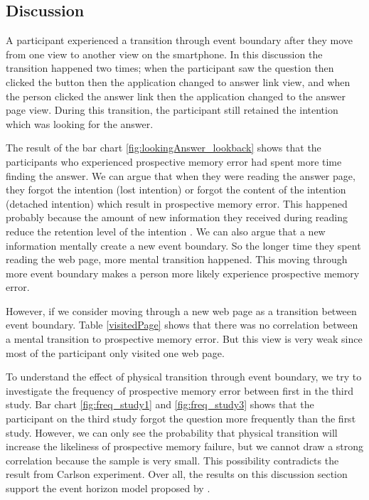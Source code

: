 \subsection{Discussion}
A participant experienced a transition through event boundary after they move from one view to another view on the smartphone.
In this discussion the transition happened two times; when the participant saw the question then clicked the button then the application changed to answer link view,
and when the person clicked the answer link then the application changed to the answer page view.
During this transition, the participant still retained the intention which was looking for the answer.

The result of the bar chart \ref{fig:lookingAnswer_lookback}  shows that the participants who experienced prospective memory error had spent more time finding the answer.
We can argue that when they were reading the answer page, they forgot the intention (lost intention) or forgot the content of the intention (detached intention) which result in prospective memory error.
This happened probably because the amount of new information they received during reading reduce the retention level of the intention \citep{Reason1984}.
We can also argue that a new information mentally create a new event boundary. So the longer time they spent reading the web page, more mental transition happened.
This moving through more event boundary makes a person more likely experience prospective memory error.

However, if we consider moving through a new web page as a transition between event boundary. Table \ref{visitedPage} shows that there was no correlation between a mental transition to prospective memory error.
But this view is very weak since most of the participant only visited one web page.

To understand the effect of physical transition through event boundary, we try to investigate the frequency of prospective memory error between first in the third study.
Bar chart \ref{fig:freq_study1} and \ref{fig:freq_study3} shows that the participant on the third study forgot the question more frequently than the first study. However,
we can only see the probability that physical transition will increase the likeliness of prospective memory failure, but
we cannot draw a strong correlation because the sample is very small.
This possibility contradicts the result from Carlson experiment.
Over all, the results on this discussion section support the event horizon model proposed by \cite{Radvansky2006}.
